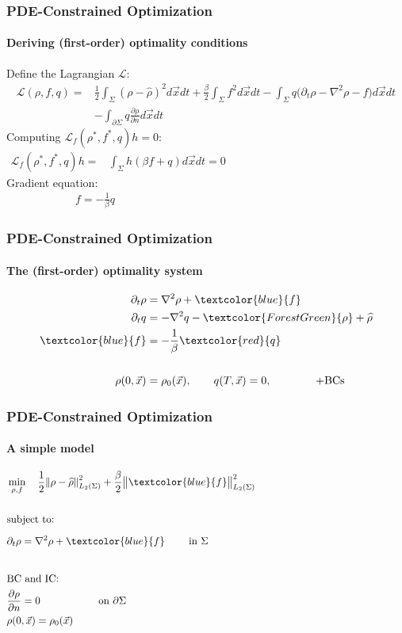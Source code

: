 \documentclass[aspectratio=169,xcolor=dvipsnames]{beamer}
\begin{document}
\begin{frame}
	\frametitle{PDE-Constrained Optimization}
	\framesubtitle{Deriving (first-order) optimality conditions}
	Define the Lagrangian $\mathcal{L}$:
	\begin{align*}
		\mathcal{L}(\rho, f,q)=& \frac{1}{2}\int_\Sigma \left(\rho- \widehat{\rho}\right)^2 d \vec x dt + \frac{\beta}{2} \int_\Sigma f^2 d \vec x dt - \int_\Sigma q \bigg( \partial_t \rho - \nabla^2 \rho  - f \bigg) d\vec{x} dt \\
		&- \int_{\partial \Sigma} q \frac{\partial \rho}{\partial n}   d\vec{x} dt
	\end{align*}
	Computing  $\mathcal{L}_f (\rho^*, f^*,q)h = 0$:
	\begin{align*}
		\mathcal{L}_f (\rho^*, f^*,q)h = & \int_\Sigma h \left(\beta f + q \right) d\vec{x} dt = 0\qquad\qquad\qquad\qquad\qquad\qquad\qquad\qquad\qquad
	\end{align*}
	Gradient equation:
	\begin{align*}
		f = -\frac{1}{\beta}q \qquad\qquad\qquad\qquad\qquad\qquad\qquad\qquad\qquad\qquad
	\end{align*}
\end{frame}
\begin{frame}
	\frametitle{PDE-Constrained Optimization}
	\framesubtitle{The (first-order) optimality system}
	
	\begin{align*}
		\partial_t \rho &= \nabla^2 \rho + \textcolor{blue}{f}  \\
		\partial_t q &=  -  \nabla^2 q - \textcolor{ForestGreen}{\rho} + \widehat \rho \\
		\textcolor{blue}{f} &= - \frac{1}{\beta}\textcolor{red}{q}\\
		\\
		\rho(0,\vec{x})&=\rho_0(\vec{x}), \qquad q(T,\vec{x})= 0, \qquad \qquad \text{+BCs}
	\end{align*}
\end{frame}
\begin{frame}
	\frametitle{PDE-Constrained Optimization}
	\framesubtitle{A simple model}
	\begin{align*}
		&\min_{\rho,f} \quad \frac{1}{2}\norm{\rho- \widehat{\rho}}_{L_2(\Sigma)}^2 + \frac{\beta}{2} \norm{\textcolor{blue}{f}}_{L_2(\Sigma)}^2\\
		\\
		&\text{subject to:}
		\\
		& \partial_t \rho = \nabla^2 \rho + \textcolor{blue}{f} \qquad \text{ in    } \Sigma   \phantom{ \nabla \cdot (\rho \vec{w})+{\nabla \cdot \int_\Omega \rho(\vec{x}) \rho(\vec{x}') \nabla V_2(|\vec{x}-\vec{x}\hspace{0.2em}'|)d\vec{x}'} }\\
		\\
		&\text{BC } \text{and IC:}\\
		&\frac{\partial \rho}{\partial n}  = 0 \quad \ \ \qquad \qquad \text{on   } \partial \Sigma   \\
		&\rho(0,\vec{x}) = \rho_0(\vec{x})
	\end{align*}
	
\end{frame}
\end{document}
